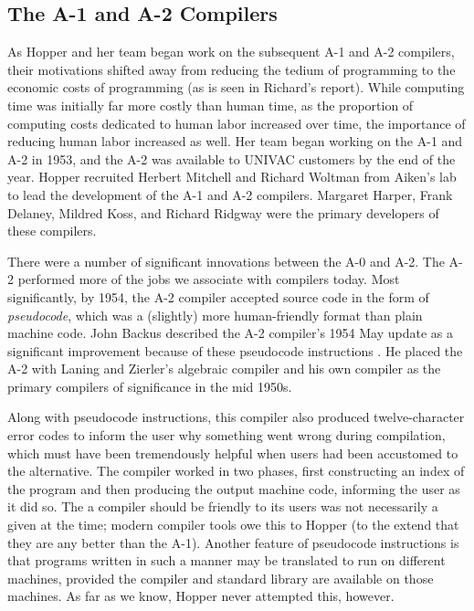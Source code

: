 \subsection{The A-1 and A-2 Compilers}

As Hopper and her team began work on the subsequent A-1 and A-2 compilers,
their motivations shifted away from reducing the tedium of programming to the
economic costs of programming (as is seen in Richard's report).
While computing time was initially far more
costly than human time, as the proportion of computing costs dedicated to human
labor increased over time, the importance of reducing human labor increased as
well.
Her team began working on the A-1 and A-2 in 1953, and the A-2 was
available to UNIVAC customers by the end of the year.
Hopper recruited Herbert Mitchell and Richard Woltman from Aiken's
lab to lead the development of the A-1 and A-2 compilers.
Margaret Harper, Frank Delaney, Mildred Koss, and Richard Ridgway were
the primary developers of these compilers.

There were a number of significant innovations between the A-0 and A-2.
The A-2 performed more of the jobs we associate with compilers today.
Most significantly, by 1954, the A-2 compiler accepted source code
in the form of \textit{pseudocode}, which was a (slightly) more human-friendly
format than plain machine code.
John Backus described the A-2 compiler's 1954 May update as a significant
improvement because of these pseudocode instructions
\cite{hopl_backus_history_of_fortran}.
He placed the A-2 with Laning and Zierler's algebraic compiler and
his own \FTNI{} compiler as the primary compilers of significance in the
mid 1950s.

Along with pseudocode instructions, this compiler also produced
twelve-character error codes to inform the user why something went wrong
during compilation, which must have been tremendously helpful when users
had been accustomed to the alternative.
The compiler worked in two phases, first constructing an index of the
program and then producing the output machine code, informing the user as
it did so.
The a compiler should be friendly to its users was not necessarily a given at
the time; modern compiler tools owe this to Hopper (to the extend that they
are any better than the A-1).
Another feature of pseudocode instructions is that programs written
in such a manner may be translated to run on different machines, provided
the compiler and standard library are available on those machines.
As far as we know, Hopper never attempted this, however.

